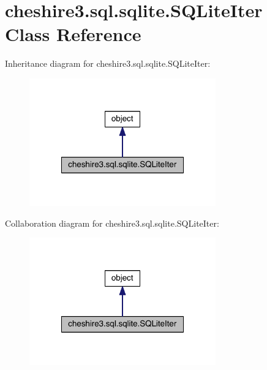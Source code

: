 \hypertarget{classcheshire3_1_1sql_1_1sqlite_1_1_s_q_lite_iter}{\section{cheshire3.\-sql.\-sqlite.\-S\-Q\-Lite\-Iter Class Reference}
\label{classcheshire3_1_1sql_1_1sqlite_1_1_s_q_lite_iter}
}


Inheritance diagram for cheshire3.\-sql.\-sqlite.\-S\-Q\-Lite\-Iter\-:
\nopagebreak
\begin{figure}[H]
\begin{center}
\leavevmode
\includegraphics[width=228pt]{classcheshire3_1_1sql_1_1sqlite_1_1_s_q_lite_iter__inherit__graph}
\end{center}
\end{figure}


Collaboration diagram for cheshire3.\-sql.\-sqlite.\-S\-Q\-Lite\-Iter\-:
\nopagebreak
\begin{figure}[H]
\begin{center}
\leavevmode
\includegraphics[width=228pt]{classcheshire3_1_1sql_1_1sqlite_1_1_s_q_lite_iter__coll__graph}
\end{center}
\end{figure}
